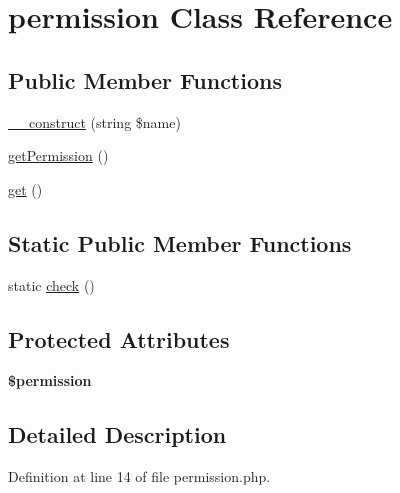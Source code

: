 \hypertarget{classcommon_1_1user_1_1permission}{\section{permission \-Class \-Reference}
\label{classcommon_1_1user_1_1permission}
}
\subsection*{\-Public \-Member \-Functions}
\begin{DoxyCompactItemize}
\item 
\hyperlink{classcommon_1_1user_1_1permission_a196b3403dd3fe36fd9617ada22960ff1}{\-\_\-\-\_\-construct} (string \$name)
\item 
\hyperlink{classcommon_1_1user_1_1permission_a478067ecf173884c2ee3e5b94e746200}{get\-Permission} ()
\item 
\hyperlink{classcommon_1_1user_1_1permission_ac33ee765f5ad9f134540bac393721cfe}{get} ()
\end{DoxyCompactItemize}
\subsection*{\-Static \-Public \-Member \-Functions}
\begin{DoxyCompactItemize}
\item 
static \hyperlink{classcommon_1_1user_1_1permission_a3a934bd1e982502106ee5dfac2e4e2ed}{check} ()
\end{DoxyCompactItemize}
\subsection*{\-Protected \-Attributes}
\begin{DoxyCompactItemize}
\item 
\hypertarget{classcommon_1_1user_1_1permission_aad04b6f3304fe6a13d5be37f7cd28938}{{\bfseries \$permission}}\label{classcommon_1_1user_1_1permission_aad04b6f3304fe6a13d5be37f7cd28938}

\end{DoxyCompactItemize}


\subsection{\-Detailed \-Description}


\-Definition at line 14 of file permission.\-php.



